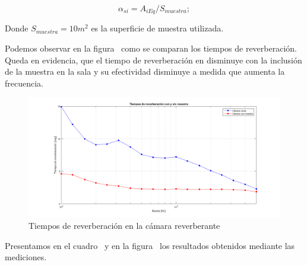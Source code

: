 \begin{equation}
    \alpha_{si} = A_{iEq} / S_{muestra};
\end{equation}

\par Donde $S_{muestra} = 10m^2$ es la superficie de muestra utilizada.\\


\par Podemos observar en la figura~ como se comparan los tiempos de reverberación. Queda en evidencia, que el tiempo de reverberación en disminuye con la inclusión de la muestra en la sala y su efectividad disminuye a medida que aumenta la frecuencia.

\begin{figure}[H]
	\centering
	\includegraphics[scale=0.47]{./img/Tiempos_reverberacion.png}
	\caption{Tiempos de reverberación en la cámara reverberante}
	\label{fig::tiempos_reverberacion}
\end{figure}

\par Presentamos en el cuadro~ y en la figura~ los resultados obtenidos mediante las mediciones.



